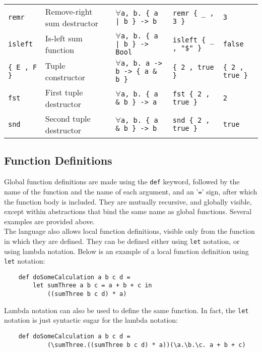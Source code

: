 \documentclass{article}
\begin{document}
{\begin{tabular}{ | p{17mm} | l | l | l | p{25mm} | }
    \texttt{remr}           & Remove-right sum destructor       & \texttt{$\forall$a, b. \{ a | b \} -> b}          & \texttt{remr \{ \_ , 3 \}}        & \texttt{3}                    \\
    \texttt{isleft}         & Is-left sum function              & \texttt{$\forall$a, b. \{ a | b \} -> Bool}       & \texttt{isleft \{ \_ , "\$" \}}   & \texttt{false}                \\
    \texttt{\{ E , F \}}    & Tuple constructor                 & \texttt{$\forall$a, b. a -> b -> \{ a \& b \}}    & \texttt{\{ 2 , true \}}           & \texttt{\{ 2 , true \}}       \\
    \texttt{fst}            & First tuple destructor            & \texttt{$\forall$a, b. \{ a \& b \} -> a}         & \texttt{fst \{ 2 , true \}}       & \texttt{2}                    \\
    \texttt{snd}            & Second tuple destructor           & \texttt{$\forall$a, b. \{ a \& b \} -> b}         & \texttt{snd \{ 2 , true \}}       & \texttt{true}                 \\
    \hline
\end{tabular}}
\subsection{Function Definitions}
Global function definitions are made using the \texttt{def} keyword, followed by the name of the function and the name of each argument, and an '\texttt{=}' sign, after which the function body is included. They are mutually recursive, and globally visible, except within abstractions that bind the same name as global functions. Several examples are provided above.
\\\indent The language also allows local function definitions, visible only from the function in which they are defined. They can be defined either using \texttt{let} notation, or using lambda notation. Below is an example of a local function definition using \texttt{let} notation:
\begin{verbatim}
    def doSomeCalculation a b c d =
        let sumThree a b c = a + b + c in
            ((sumThree b c d) * a)
\end{verbatim}
Lambda notation can also be used to define the same function. In fact, the \texttt{let} notation is just syntactic sugar for the lambda notation:
\begin{verbatim}
    def doSomeCalculation a b c d =
            (\sumThree.((sumThree b c d) * a))(\a.\b.\c. a + b + c)
\end{verbatim}
\end{document}
